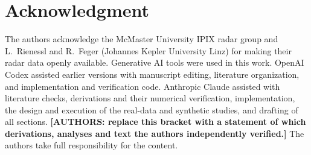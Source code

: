 \documentclass[journal]{IEEEtran}
\begin{document}
\section*{Acknowledgment}
The authors acknowledge the McMaster University IPIX radar group and L.~Rienessl and R.~Feger (Johannes Kepler University Linz) for making their radar data openly available. Generative AI tools were used in this work. OpenAI Codex assisted earlier versions with manuscript editing, literature organization, and implementation and verification code. Anthropic Claude assisted with literature checks, derivations and their numerical verification, implementation, the design and execution of the real-data and synthetic studies, and drafting of all sections. \textbf{[AUTHORS: replace this bracket with a statement of which derivations, analyses and text the authors independently verified.]} The authors take full responsibility for the content.



\end{document}
